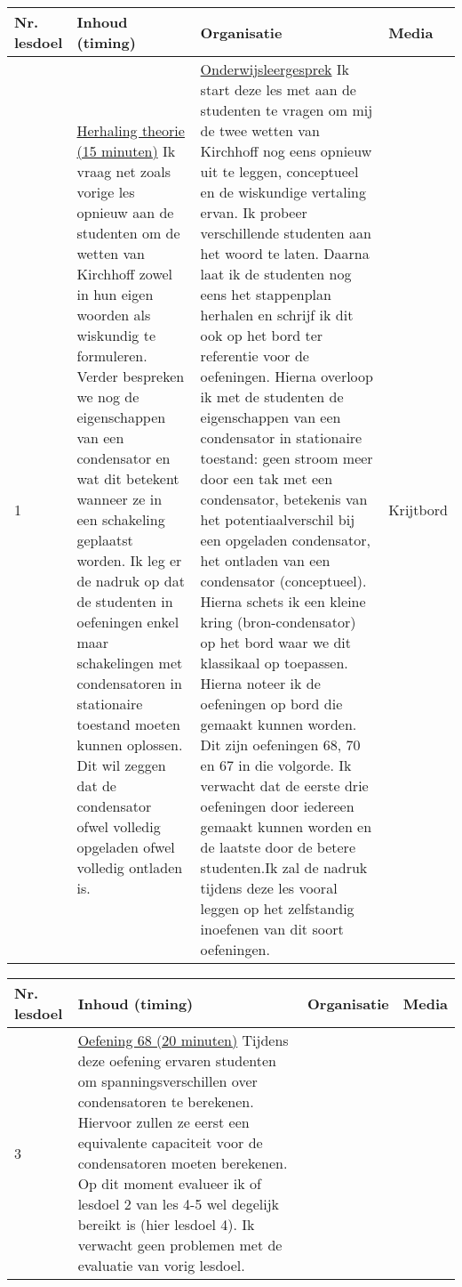\begin{landscape}
\begin{tabularx}{1.56\textwidth}{|p{1.5cm}|p{6cm}|X|p{3cm}|}
	\hline
	\textbf{Nr. lesdoel } & \textbf{Inhoud (timing)}  & \textbf{Organisatie } & \textbf{Media } \\ \hline
	1\newline 2 &\underline{Herhaling theorie (15 minuten)}\newline
	Ik vraag net zoals vorige les opnieuw aan de studenten om de wetten van Kirchhoff zowel in hun eigen woorden als wiskundig te formuleren. Verder bespreken we nog de eigenschappen van een condensator en wat dit betekent wanneer ze in een schakeling geplaatst worden. Ik leg er de nadruk op dat de studenten in oefeningen enkel maar schakelingen met condensatoren in stationaire toestand moeten kunnen oplossen. Dit wil zeggen dat de condensator ofwel volledig opgeladen ofwel volledig ontladen is.
	&  \underline{Onderwijsleergesprek}\newline 
	Ik start deze les met aan de studenten te vragen om mij de twee wetten van Kirchhoff nog eens opnieuw uit te leggen, conceptueel en de wiskundige vertaling ervan. Ik probeer verschillende studenten aan het woord te laten. Daarna laat ik de studenten nog eens het stappenplan herhalen en schrijf ik dit ook op het bord ter referentie voor de oefeningen. \newline Hierna overloop ik met de studenten de eigenschappen van een condensator in stationaire toestand: geen stroom meer door een tak met een condensator, betekenis van het potentiaalverschil bij een opgeladen condensator, het ontladen van een condensator (conceptueel). Hierna schets ik een kleine kring (bron-condensator) op het bord waar we dit klassikaal op toepassen.\newline 
	Hierna noteer ik de oefeningen op bord die gemaakt kunnen worden. Dit zijn oefeningen 68, 70 en 67 in die volgorde. Ik verwacht dat de eerste drie oefeningen door iedereen gemaakt kunnen worden en de laatste door de betere studenten.\newline Ik zal de nadruk tijdens deze les vooral leggen op het zelfstandig inoefenen van dit soort oefeningen. 
	& Krijtbord 
	\\ \hline
\end{tabularx}

\begin{tabularx}{1.56\textwidth}{|p{1.5cm}|p{6cm}|X|p{4cm}|}
	\hline
	\textbf{Nr. lesdoel } & \textbf{Inhoud (timing)}  & \textbf{Organisatie } & \textbf{Media } \\ \hline
	3 \newline 4\newline 6	&\underline{Oefening 68 (20 minuten)}\newline
	Tijdens deze oefening ervaren studenten om spanningsverschillen over condensatoren te berekenen. Hiervoor zullen ze eerst een equivalente capaciteit voor de condensatoren moeten berekenen. Op dit moment evalueer ik of lesdoel 2 van les 4-5 wel degelijk bereikt is (hier lesdoel 4). Ik verwacht geen problemen met de evaluatie van vorig lesdoel. 
	

\end{tabularx}
\end{landscape}
